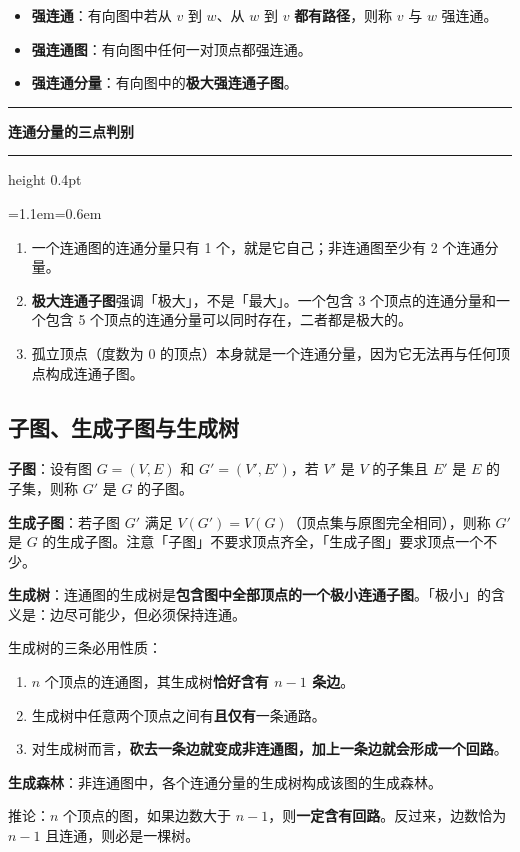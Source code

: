 \documentclass[11pt,openany,UTF8]{ctexbook}
\newcommand{\callouthead}[2]{%
  \par\addvspace{7pt}\noindent
  {\color{#1}\rule[-0.15em]{3pt}{1.05em}}\hspace{0.5em}%
  {\bfseries\color{#1}#2}\par\nobreak\vspace{-0.35em}%
  {\color{rulesep}\hrule height 0.4pt}\nobreak\vspace{0.45em}%
  \begingroup\small\setlength{\parindent}{0pt}%
  \leftskip=1.1em\rightskip=0.6em\noindent\ignorespaces}
\newcommand{\calloutend}{\par\endgroup\addvspace{7pt}}
\newenvironment{callkey}[1]{\callouthead{keybar}{#1}}{\calloutend}
\begin{document}
\begin{itemize}
\item \textbf{强连通}：有向图中若从 $v$ 到 $w$、从 $w$ 到 $v$ \textbf{都有路径}，则称 $v$ 与 $w$ 强连通。
\item \textbf{强连通图}：有向图中任何一对顶点都强连通。
\item \textbf{强连通分量}：有向图中的\textbf{极大强连通子图}。
\end{itemize}
\begin{callkey}{连通分量的三点判别}
\begin{enumerate}
\item 一个连通图的连通分量只有 1 个，就是它自己；非连通图至少有 2 个连通分量。
\item \textbf{极大连通子图}强调「极大」，不是「最大」。一个包含 3 个顶点的连通分量和一个包含 5 个顶点的连通分量可以同时存在，二者都是极大的。
\item 孤立顶点（度数为 0 的顶点）本身就是一个连通分量，因为它无法再与任何顶点构成连通子图。
\end{enumerate}
\end{callkey}

\subsection{子图、生成子图与生成树}

\textbf{子图}：设有图 $G=(V,E)$ 和 $G'=(V',E')$，若 $V'$ 是 $V$ 的子集且 $E'$ 是 $E$ 的子集，则称 $G'$ 是 $G$ 的子图。

\textbf{生成子图}：若子图 $G'$ 满足 $V(G')=V(G)$（顶点集与原图完全相同），则称 $G'$ 是 $G$ 的生成子图。注意「子图」不要求顶点齐全，「生成子图」要求顶点一个不少。

\textbf{生成树}：连通图的生成树是\textbf{包含图中全部顶点的一个极小连通子图}。「极小」的含义是：边尽可能少，但必须保持连通。

生成树的三条必用性质：

\begin{enumerate}
\item $n$ 个顶点的连通图，其生成树\textbf{恰好含有 $n-1$ 条边}。
\item 生成树中任意两个顶点之间有\textbf{且仅有}一条通路。
\item 对生成树而言，\textbf{砍去一条边就变成非连通图，加上一条边就会形成一个回路}。
\end{enumerate}
\textbf{生成森林}：非连通图中，各个连通分量的生成树构成该图的生成森林。

推论：$n$ 个顶点的图，如果边数大于 $n-1$，则\textbf{一定含有回路}。反过来，边数恰为 $n-1$ 且连通，则必是一棵树。
\end{document}

